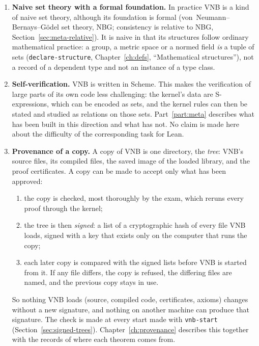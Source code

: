 \begin{enumerate}
  The little-theories approach of IMPS~\cite{LittleTheories} appears in a
  smaller role: the structures of the library and the relations between
  them (refinement, and viewing one structure as another,
  Section~\ref{sec:view-as}) are drawn as a graph, the structure graph,
  one of the reference pages that the workspace opens
  (Section~\ref{sec:emacs}).
\item \textbf{Naive set theory with a formal foundation.}  In practice VNB
  is a kind of naive set theory, although its foundation is formal
  (von~Neumann--Bernays--G\"odel set theory, NBG; consistency is relative to
  NBG, Section~\ref{sec:meta-relative}).  It is naive in that its structures follow
  ordinary mathematical practice: a group, a metric space or a normed field
  \emph{is} a tuple of sets (\texttt{declare-structure}, Chapter~\ref{ch:defs},
  ``Mathematical structures''), not a record of a dependent type and not an
  instance of a type class.
\item \textbf{Self-verification.}  VNB is written in Scheme.  This makes
  the verification of large parts of its own code less challenging: the
  kernel's data are S-expressions, which can be encoded as sets, and the
  kernel rules can then be stated and studied as relations on those sets.
  Part~\ref{part:meta} describes what has been built in this direction
  and what has not.  No claim is made here about the difficulty of the
  corresponding task for Lean.
\item \textbf{Provenance of a copy.}  A copy of VNB is one directory,
  the \emph{tree}: VNB's source files,
  its compiled files, the saved image of the loaded library, and the
  proof certificates.  A copy can be made to accept only what has been
  approved:
  \begin{enumerate}
  \item the copy is checked, most thoroughly by the exam, which reruns
    every proof through the kernel;
  \item the tree is then \emph{signed}: a list of a cryptographic hash
    of every file VNB loads, signed with a key that exists only on the
    computer that runs the copy;
  \item each later copy is compared with the signed lists before VNB is
    started from it.  If any file differs, the copy is refused, the
    differing files are named, and the previous copy stays in use.
  \end{enumerate}
  So nothing VNB loads (source, compiled code, certificates, axioms)
  changes without a new signature, and nothing on another machine can
  produce that signature.  The check is made at every start made with
  \texttt{vnb-start} (Section~\ref{sec:signed-trees}).  Chapter~\ref{ch:provenance}
  describes this together with the records of where each theorem comes
  from.
\end{enumerate}

